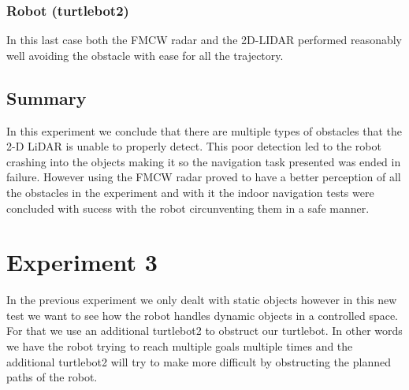 \subsubsection{Robot  (turtlebot2) }
In this last case both the \ac{FMCW} \ac{radar} and the 2D-LIDAR performed reasonably well avoiding the obstacle with ease for all the trajectory.

\subsection{Summary}
In this experiment we conclude that there are multiple types of obstacles that the 2-D LiDAR is unable to properly detect. This poor detection led to the robot crashing into the objects making it so the navigation task presented was ended in failure. However using the \ac{FMCW} radar proved to have a better perception of all the obstacles in the experiment and with it the indoor navigation tests were concluded with sucess with the robot circunventing them in a safe manner.
\section{Experiment 3}
In the previous experiment we only dealt with static objects however in this new test we want to see how the robot handles dynamic objects in a controlled space. For that we use an additional turtlebot2 to obstruct our turtlebot. In other words we have the robot trying to reach multiple goals multiple times and the additional turtlebot2 will try to make more difficult by obstructing the planned paths of the robot.


